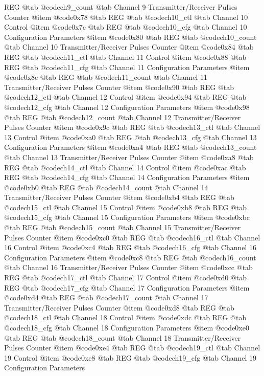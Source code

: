 REG @tab
@code{ch9_count} @tab
Channel 9 Transmitter/Receiver Pulses Counter
@item @code{0x78} @tab
REG @tab
@code{ch10_ctl} @tab
Channel 10 Control
@item @code{0x7c} @tab
REG @tab
@code{ch10_cfg} @tab
Channel 10 Configuration Parameters
@item @code{0x80} @tab
REG @tab
@code{ch10_count} @tab
Channel 10 Transmitter/Receiver Pulses Counter
@item @code{0x84} @tab
REG @tab
@code{ch11_ctl} @tab
Channel 11 Control
@item @code{0x88} @tab
REG @tab
@code{ch11_cfg} @tab
Channel 11 Configuration Parameters
@item @code{0x8c} @tab
REG @tab
@code{ch11_count} @tab
Channel 11 Transmitter/Receiver Pulses Counter
@item @code{0x90} @tab
REG @tab
@code{ch12_ctl} @tab
Channel 12 Control
@item @code{0x94} @tab
REG @tab
@code{ch12_cfg} @tab
Channel 12 Configuration Parameters
@item @code{0x98} @tab
REG @tab
@code{ch12_count} @tab
Channel 12 Transmitter/Receiver Pulses Counter
@item @code{0x9c} @tab
REG @tab
@code{ch13_ctl} @tab
Channel 13 Control
@item @code{0xa0} @tab
REG @tab
@code{ch13_cfg} @tab
Channel 13 Configuration Parameters
@item @code{0xa4} @tab
REG @tab
@code{ch13_count} @tab
Channel 13 Transmitter/Receiver Pulses Counter
@item @code{0xa8} @tab
REG @tab
@code{ch14_ctl} @tab
Channel 14 Control
@item @code{0xac} @tab
REG @tab
@code{ch14_cfg} @tab
Channel 14 Configuration Parameters
@item @code{0xb0} @tab
REG @tab
@code{ch14_count} @tab
Channel 14 Transmitter/Receiver Pulses Counter
@item @code{0xb4} @tab
REG @tab
@code{ch15_ctl} @tab
Channel 15 Control
@item @code{0xb8} @tab
REG @tab
@code{ch15_cfg} @tab
Channel 15 Configuration Parameters
@item @code{0xbc} @tab
REG @tab
@code{ch15_count} @tab
Channel 15 Transmitter/Receiver Pulses Counter
@item @code{0xc0} @tab
REG @tab
@code{ch16_ctl} @tab
Channel 16 Control
@item @code{0xc4} @tab
REG @tab
@code{ch16_cfg} @tab
Channel 16 Configuration Parameters
@item @code{0xc8} @tab
REG @tab
@code{ch16_count} @tab
Channel 16 Transmitter/Receiver Pulses Counter
@item @code{0xcc} @tab
REG @tab
@code{ch17_ctl} @tab
Channel 17 Control
@item @code{0xd0} @tab
REG @tab
@code{ch17_cfg} @tab
Channel 17 Configuration Parameters
@item @code{0xd4} @tab
REG @tab
@code{ch17_count} @tab
Channel 17 Transmitter/Receiver Pulses Counter
@item @code{0xd8} @tab
REG @tab
@code{ch18_ctl} @tab
Channel 18 Control
@item @code{0xdc} @tab
REG @tab
@code{ch18_cfg} @tab
Channel 18 Configuration Parameters
@item @code{0xe0} @tab
REG @tab
@code{ch18_count} @tab
Channel 18 Transmitter/Receiver Pulses Counter
@item @code{0xe4} @tab
REG @tab
@code{ch19_ctl} @tab
Channel 19 Control
@item @code{0xe8} @tab
REG @tab
@code{ch19_cfg} @tab
Channel 19 Configuration Parameters
